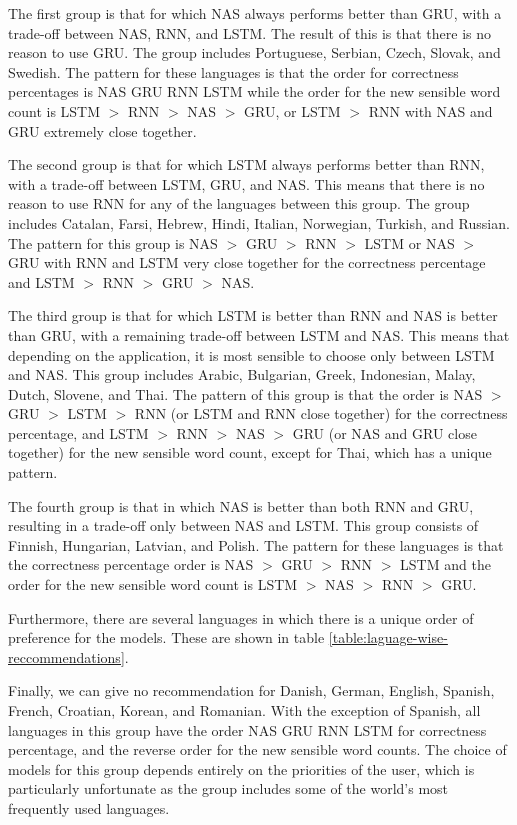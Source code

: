 \documentclass[11pt,a4paper,twoside,openright]{scrbook}
\begin{document}
The first group is that for which NAS always performs better than GRU, with a trade-off between NAS, RNN, and LSTM. The result of this is that there is no reason to use GRU. The group includes Portuguese, Serbian, Czech, Slovak, and Swedish. The pattern for these languages is that the order for correctness percentages is NAS GRU RNN LSTM while the order for the new sensible word count is LSTM $>$ RNN $>$ NAS $>$ GRU, or LSTM $>$ RNN with NAS and GRU extremely close together. 

The second group is that for which LSTM always performs better than RNN, with a trade-off between LSTM, GRU, and NAS. This means that there is no reason to use RNN for any of the languages between this group. The group includes Catalan, Farsi, Hebrew, Hindi, Italian, Norwegian, Turkish, and Russian. The pattern for this group is NAS $>$ GRU $>$ RNN $>$ LSTM or NAS $>$ GRU with RNN and LSTM very close together for the correctness percentage and LSTM $>$ RNN $>$ GRU $>$ NAS.  

The third group is that for which LSTM is better than RNN and NAS is better than GRU, with a remaining trade-off between LSTM and NAS. This means that depending on the application, it is most sensible to choose only between LSTM and NAS. This group includes Arabic, Bulgarian, Greek, Indonesian, Malay, Dutch, Slovene, and Thai. The pattern of this group is that the order is NAS $>$ GRU $>$ LSTM $>$ RNN (or LSTM and RNN close together) for the correctness percentage, and LSTM $>$ RNN $>$ NAS $>$ GRU (or NAS and GRU close together) for the new sensible word count, except for Thai, which has a unique pattern. 

The fourth group is that in which NAS is better than both RNN and GRU, resulting in a trade-off only between NAS and LSTM. This group consists of Finnish, Hungarian, Latvian, and Polish. The pattern for these languages is that the correctness percentage order is NAS $>$ GRU $>$ RNN $>$ LSTM and the order for the new sensible word count is LSTM $>$ NAS $>$ RNN $>$ GRU. 

Furthermore, there are several languages in which there is a unique order of preference for the models. These are shown in table \ref{table:laguage-wise-reccommendations}.

Finally, we can give no recommendation for Danish, German, English, Spanish, French, Croatian, Korean, and Romanian. With the exception of Spanish, all languages in this group have the order NAS GRU RNN LSTM for correctness percentage, and the reverse order for the new sensible word counts. The choice of models for this group depends entirely on the priorities of the user, which is particularly unfortunate as the group includes some of the world’s most frequently used languages.
\end{document}
